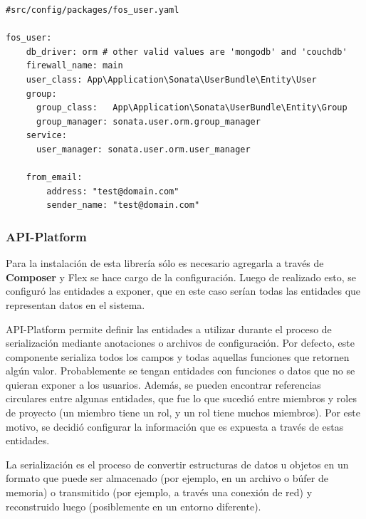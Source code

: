 \newpage
\begin{lstlisting}[caption=Archivo de configuración de FOSUser.\\Fuente: \sonatainstallation]
#src/config/packages/fos_user.yaml

fos_user:
    db_driver: orm # other valid values are 'mongodb' and 'couchdb'
    firewall_name: main
    user_class: App\Application\Sonata\UserBundle\Entity\User
    group:
      group_class:   App\Application\Sonata\UserBundle\Entity\Group
      group_manager: sonata.user.orm.group_manager
    service:
      user_manager: sonata.user.orm.user_manager

    from_email:
        address: "test@domain.com"
        sender_name: "test@domain.com"

\end{lstlisting}

\subsubsection{API-Platform}%
\label{ssub:api_platform}

Para la instalación de esta librería sólo es necesario agregarla a través de \textbf{Composer} y Flex se hace cargo de la configuración\@. Luego de realizado
esto, se configuró las entidades a exponer, que en este caso serían todas las entidades que representan datos en el sistema.


API-Platform permite definir las entidades a utilizar durante el proceso de serialización mediante anotaciones o archivos de configuración. Por defecto,
este componente serializa todos los campos y todas aquellas funciones que retornen algún valor\@. Probablemente se tengan entidades con funciones o datos
que no se quieran exponer a los usuarios. Además, se pueden encontrar referencias circulares entre algunas entidades, que fue lo que sucedió entre miembros
y roles de proyecto (un miembro tiene un rol, y un rol tiene muchos miembros)\@.  Por este motivo, se decidió configurar la información que es expuesta a
través de estas entidades.



La serialización es el proceso de convertir estructuras de datos u objetos en un formato que puede ser almacenado (por ejemplo, en un archivo o búfer de memoria)
o transmitido (por ejemplo, a través una conexión de red) y reconstruido luego (posiblemente en un entorno diferente).~\parencite{serialization}

